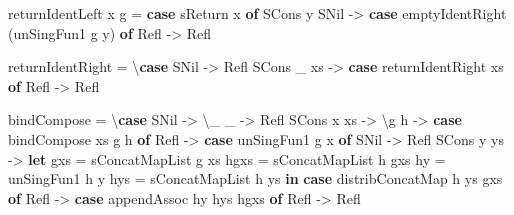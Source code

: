 \documentclass[]{article}
\newenvironment{Shaded}{}{}
\newcommand{\DataTypeTok}[1]{\textcolor[rgb]{0.56,0.13,0.00}{#1}}
\newcommand{\FunctionTok}[1]{\textcolor[rgb]{0.02,0.16,0.49}{#1}}
\newcommand{\KeywordTok}[1]{\textcolor[rgb]{0.00,0.44,0.13}{\textbf{#1}}}
\newcommand{\NormalTok}[1]{#1}
\newcommand{\OtherTok}[1]{\textcolor[rgb]{0.00,0.44,0.13}{#1}}
\begin{document}
\begin{Shaded}
\begin{Highlighting}[]
\NormalTok{    returnIdentLeft x g }\FunctionTok{=} \KeywordTok{case}\NormalTok{ sReturn x }\KeywordTok{of}
      \DataTypeTok{SCons}\NormalTok{ y }\DataTypeTok{SNil} \OtherTok{->} \KeywordTok{case}\NormalTok{ emptyIdentRight (unSingFun1 g y) }\KeywordTok{of}
        \DataTypeTok{Refl} \OtherTok{->} \DataTypeTok{Refl}

\NormalTok{    returnIdentRight }\FunctionTok{=}\NormalTok{ \textbackslash{}}\KeywordTok{case}
      \DataTypeTok{SNil}       \OtherTok{->} \DataTypeTok{Refl}
      \DataTypeTok{SCons}\NormalTok{ _ xs }\OtherTok{->} \KeywordTok{case}\NormalTok{ returnIdentRight xs }\KeywordTok{of}
        \DataTypeTok{Refl} \OtherTok{->} \DataTypeTok{Refl}

\NormalTok{    bindCompose }\FunctionTok{=}\NormalTok{ \textbackslash{}}\KeywordTok{case}
      \DataTypeTok{SNil}       \OtherTok{->}\NormalTok{ \textbackslash{}_ _ }\OtherTok{->} \DataTypeTok{Refl}
      \DataTypeTok{SCons}\NormalTok{ x xs }\OtherTok{->}\NormalTok{ \textbackslash{}g h }\OtherTok{->} \KeywordTok{case}\NormalTok{ bindCompose xs g h }\KeywordTok{of}
        \DataTypeTok{Refl} \OtherTok{->} \KeywordTok{case}\NormalTok{ unSingFun1 g x }\KeywordTok{of}
          \DataTypeTok{SNil}       \OtherTok{->} \DataTypeTok{Refl}
          \DataTypeTok{SCons}\NormalTok{ y ys }\OtherTok{->}
            \KeywordTok{let}\NormalTok{ gxs  }\FunctionTok{=}\NormalTok{ sConcatMapList g xs}
\NormalTok{                hgxs }\FunctionTok{=}\NormalTok{ sConcatMapList h gxs}
\NormalTok{                hy   }\FunctionTok{=}\NormalTok{ unSingFun1 h y}
\NormalTok{                hys  }\FunctionTok{=}\NormalTok{ sConcatMapList h ys}
            \KeywordTok{in}  \KeywordTok{case}\NormalTok{ distribConcatMap h ys gxs }\KeywordTok{of}
                  \DataTypeTok{Refl} \OtherTok{->} \KeywordTok{case}\NormalTok{ appendAssoc hy hys hgxs }\KeywordTok{of}
                    \DataTypeTok{Refl} \OtherTok{->} \DataTypeTok{Refl}


\end{Highlighting}
\end{Shaded}
\end{document}
